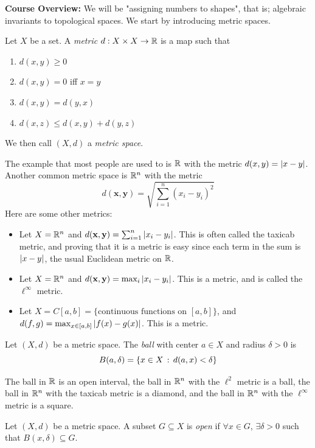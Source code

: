 
\textbf{Course Overview:} We will be "assigning numbers to shapes", that is; algebraic invariants to topological spaces. We start by introducing metric spaces.

\begin{definition}
    Let $X$ be a set. A \emph{metric} $d : X \times X \to \mathbb{R}$ is a map such that
    \begin{enumerate}
        \item $d(x, y) \geq 0$
        \item $d(x, y) = 0$ iff $x = y$
        \item $d(x, y) = d(y, x)$
        \item $d(x, z) \leq d(x, y) + d(y, z)$
    \end{enumerate}
	We then call $(X, d)$ a \emph{metric space}.
\end{definition}
The example that most people are used to is $\mathbb{R}$ with the metric $d(x, y) = \left\lvert {x - y} \right\rvert$. Another common metric space is $\mathbb{R}^n$ with the metric
\[ d(\textbf{x}, \textbf{y}) = \sqrt{\sum_{i = 1}^{n} (x_{i} - y_{i})^2} \]
Here are some other metrics:\\


\begin{itemize}
	\item Let $X = \mathbb{R}^n$ and $d(\mathbf{x}, \mathbf{y}) = \sum_{i = 1}^{n} \left\lvert {x_{i} - y_{i}} \right\rvert$. This is often called the taxicab metric, and proving that it is a metric is easy since each term in the sum is $\left\lvert {x - y} \right\rvert$, the usual Euclidean metric on $\mathbb{R}$.
	\item Let $X = \mathbb{R}^n$ and $d(\mathbf{x}, \mathbf{y}) = \max_{i} \left\lvert {x_{i} - y_{i}} \right\rvert$. This is a metric, and is called the $\ell^{\infty}$ metric.
	\item Let $X = C[a, b] = \{\text{continuous functions on } [a, b]\}$, and $d(f, g) = \max_{x \in [a, b]}\left\lvert {f(x) - g(x)} \right\rvert$. This is a metric.
\end{itemize}

\begin{definition}
	Let $(X, d)$ be a metric space. The \emph{ball} with center $a \in X$ and radius $\delta > 0$ is
	\[ B(a, \delta) = \{x \in X \, :\, d(a, x) < \delta \} \]
\end{definition}
The ball in $\mathbb{R}$ is an open interval, the ball in $\mathbb{R}^n$ with the $\ell^2$ metric is a ball, the ball in $\mathbb{R}^n$ with the taxicab metric is a diamond, and the ball in $\mathbb{R}^n$ with the $\ell^{\infty}$ metric is a square. 

\begin{definition}
	Let $(X, d)$ be a metric space. A subset $G \subseteq X$ is \emph{open} if $\forall x \in G$, $\exists \delta > 0$ such that $B(x, \delta) \subseteq G$. 
\end{definition}
\clearpage